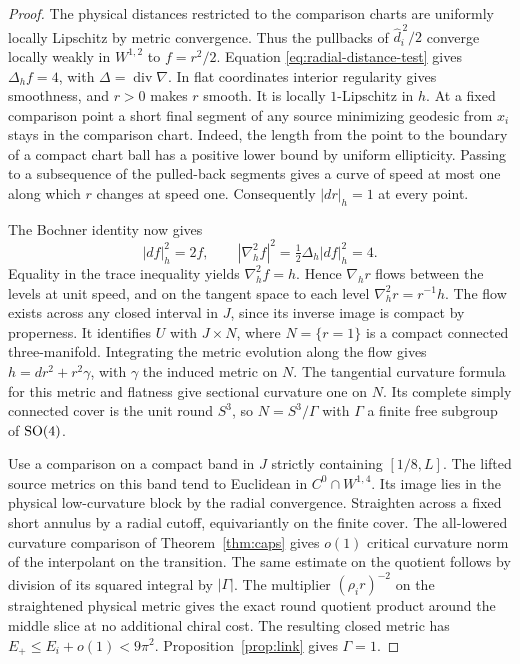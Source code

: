 \begin{proof}
The physical distances restricted to the comparison charts
are uniformly locally Lipschitz by metric convergence.
Thus the pullbacks of \(\widehat d_i^{\,2}/2\) converge
locally weakly in \(W^{1,2}\) to \(f=r^2/2\). Equation
\eqref{eq:radial-distance-test} gives \(\Delta_h f=4\),
with \(\Delta=\operatorname{div}\nabla\). In flat coordinates
interior regularity gives smoothness, and \(r>0\) makes \(r\)
smooth. It is locally \(1\)-Lipschitz in \(h\). At a fixed
comparison point a short final segment of any source minimizing
geodesic from \(x_i\) stays in the comparison chart. Indeed,
the length from the point to the boundary of a compact chart
ball has a positive lower bound by uniform ellipticity.
Passing to a subsequence of the pulled-back segments gives a curve
of speed at most one along which \(r\) changes at speed one.
Consequently \(|dr|_h=1\) at every point.

The Bochner identity now gives
\[
 |df|_h^2=2f,\qquad
 |\nabla_h^2 f|^2=\tfrac12\Delta_h |df|_h^2=4.
\]
Equality in the trace inequality yields \(\nabla_h^2 f=h\).
Hence \(\nabla_h r\) flows between the levels at unit speed,
and on the tangent space to each level
\(\nabla_h^2 r=r^{-1}h\). The flow exists across any closed
interval in \(J\), since its inverse image is compact by
properness. It identifies \(U\) with
\(J\times N\), where \(N=\{r=1\}\) is a compact
connected three-manifold. Integrating the metric evolution
along the flow gives \(h=dr^2+r^2\gamma\), with \(\gamma\)
the induced metric on \(N\). The tangential curvature formula
for this metric and flatness give sectional curvature one
on \(N\). Its complete simply connected cover is the unit
round \(S^3\), so \(N=S^3/\Gamma\) with \(\Gamma\) a finite
free subgroup of \(\operatorname{SO}(4)\).

Use a comparison on a compact band in \(J\) strictly
containing \([1/8,L]\). The lifted source metrics on this
band tend to Euclidean in \(C^0\cap W^{1,4}\). Its image
lies in the physical low-curvature block by the radial
convergence. Straighten across a fixed short annulus by a
radial cutoff, equivariantly on the finite cover. The
all-lowered curvature comparison of Theorem~\ref{thm:caps}
gives \(o(1)\) critical curvature norm of the interpolant
on the transition. The same estimate on the quotient follows
by division of its squared integral by \(|\Gamma|\).
The multiplier \((\rho_i r)^{-2}\) on the straightened
physical metric gives the exact round quotient product
around the middle slice at no additional chiral cost.
The resulting closed metric has \(E_+\le E_i+o(1)<9\pi^2\).
Proposition~\ref{prop:link} gives \(\Gamma=1\).


\end{proof}
